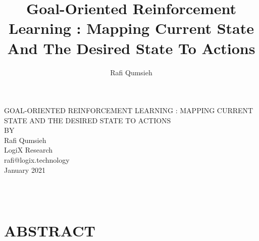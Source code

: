 \documentclass[12pt]{article}
\title{Goal-Oriented Reinforcement Learning : Mapping Current State And The Desired State To Actions}
\author{Rafi Qumsieh}
\renewcommand{\contentsname}{TABLE OF CONTENTS}
\theoremstyle{definition}
\theoremstyle{remark}
\theoremstyle{definition}
\begin{document}
\thispagestyle{empty} %
\begin{singlespace}
\end{singlespace}
	\begin{center}
	
		GOAL-ORIENTED REINFORCEMENT LEARNING : MAPPING CURRENT STATE AND THE DESIRED STATE TO ACTIONS \vspace*{-0.1cm}\\ $\;$ \\
		BY  \vspace*{-0.1cm}\\ $\;$ \\
		Rafi Qumsieh\vspace*{-0.2cm} \\ $\;$  \\
		LogiX Research\vspace*{-0.2cm} \\ $\;$ \\
		rafi@logix.technology\vspace*{-0.2cm} \\ $\;$ \\
		January 2021 \vspace*{-0.1cm}\\ $\;$  \\ 
	\end{center}\vspace*{-0.3cm}
	\begin{tabular}{ p{3in} p{3in}}
	\end{tabular}\\ \vspace*{-0.1cm}$\;$  \\ 




\renewcommand{\contentsname}{\bfseries\normalsize TABLE OF CONTENTS\hfill}
\setlength{\cftaftertoctitleskip}{1cm}
\renewcommand{\cfttoctitlefont}{\hfill\bfseries}
\renewcommand{\cftaftertoctitle}{\hfill}

\newpage
\vspace*{1cm}
\section*{ABSTRACT} \vspace*{0.5cm}
\end{document}
